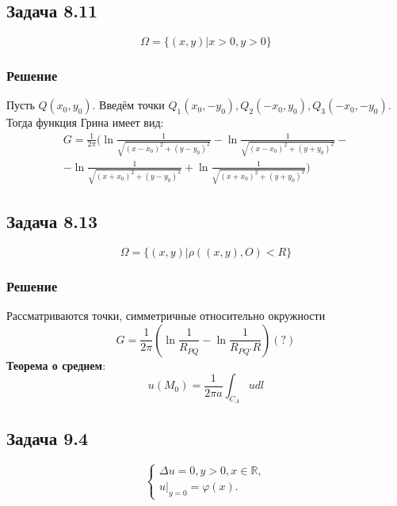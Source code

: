 \documentclass[11pt]{article}
\newcounter{th}\setcounter{th}{0}
\begin{document}
\subsection{Задача 8.11}
\label{sec:orga0a434c}
\begin{equation}
\Omega = \{(x, y) | x > 0, y > 0\}
\end{equation}
\subsubsection{Решение}
\label{sec:org5c857c6}
Пусть $Q(x_0, y_0)$. Введём точки $Q_1(x_0, -y_0), Q_2(-x_0, y_0), Q_3(-x_0, -y_0)$. Тогда функция
Грина имеет вид:
\begin{multline}
G = \frac1{2\pi}(\ln\frac1{\sqrt{(x - x_0)^2 + (y - y_0)^2}} -
\ln\frac1{\sqrt{(x - x_0)^2 + (y + y_0)^2}} - \\
- \ln\frac1{\sqrt{(x + x_0)^2 + (y - y_0)^2}} +
\ln\frac1{\sqrt{(x + x_0)^2 + (y + y_0)^2}})
\end{multline}
\subsection{Задача 8.13}
\label{sec:orgf56a753}
\begin{equation}
\Omega = \{(x, y) | \rho((x, y), O) < R\}
\end{equation}
\subsubsection{Решение}
\label{sec:org0a7ffc3}
Рассматриваются точки, симметричные относительно окружности
\begin{equation}
G = \frac1{2\pi}\left(\ln\frac1{R_{PQ}} - \ln\frac1{R_{PQ'}R}\right)(?)
\end{equation}
\textbf{Теорема о среднем}:
\begin{equation}
u(M_0) = \frac1{2\pi a}\int_{C_A}udl
\end{equation}
\subsection{Задача 9.4}
\label{sec:org6adc335}
\begin{equation}
\begin{cases}
\Delta u = 0, y > 0, x \in \mathbb{R}, \\
u|_{y = 0} = \varphi(x).
\end{cases}
\end{equation}
\end{document}
